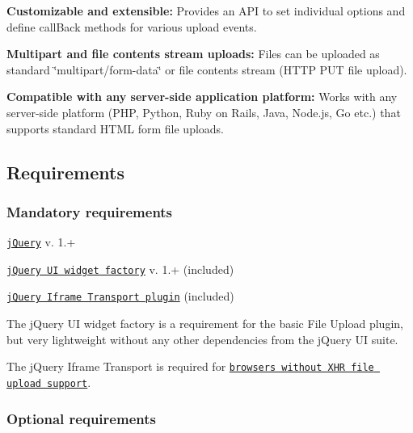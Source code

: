 \begin{DoxyItemize}
\item {\bfseries Customizable and extensible\-:} Provides an A\-P\-I to set individual options and define call\-Back methods for various upload events.
\item {\bfseries Multipart and file contents stream uploads\-:} Files can be uploaded as standard \char`\"{}multipart/form-\/data\char`\"{} or file contents stream (H\-T\-T\-P P\-U\-T file upload).
\item {\bfseries Compatible with any server-\/side application platform\-:} Works with any server-\/side platform (P\-H\-P, Python, Ruby on Rails, Java, Node.\-js, Go etc.) that supports standard H\-T\-M\-L form file uploads.
\end{DoxyItemize}

\subsection*{Requirements}

\subsubsection*{Mandatory requirements}


\begin{DoxyItemize}
\item \href{http://jquery.com/}{\tt j\-Query} v. 1.+
\item \href{http://api.jqueryui.com/jQuery.widget/}{\tt j\-Query U\-I widget factory} v. 1.+ (included)
\item \href{https://github.com/blueimp/jQuery-File-Upload/blob/master/js/jquery.iframe-transport.js}{\tt j\-Query Iframe Transport plugin} (included)
\end{DoxyItemize}

The j\-Query U\-I widget factory is a requirement for the basic File Upload plugin, but very lightweight without any other dependencies from the j\-Query U\-I suite.

The j\-Query Iframe Transport is required for \href{https://github.com/blueimp/jQuery-File-Upload/wiki/Browser-support}{\tt browsers without X\-H\-R file upload support}.

\subsubsection*{Optional requirements}


